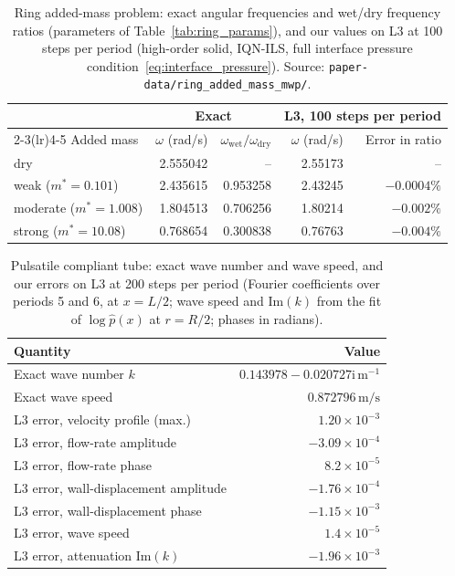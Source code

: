 \begin{table}[htbp]
	\centering
	\small
	\caption{Ring added-mass problem: exact angular frequencies and wet/dry frequency ratios (parameters of Table~\ref{tab:ring_params}), and our values on L3 at 100 steps per period (high-order solid, IQN-ILS, full interface pressure condition~\eqref{eq:interface_pressure}). Source: \texttt{paper-data/ring\_added\_mass\_mwp/}.}
	\label{tab:refvals_ring}
	\begin{tabular}{lrrrr}
		\toprule
		 & \multicolumn{2}{c}{Exact} & \multicolumn{2}{c}{L3, 100 steps per period} \\
		\cmidrule(lr){2-3}\cmidrule(lr){4-5}
		Added mass & $\omega$ (rad/s) & $\omega_\mathrm{wet}/\omega_\mathrm{dry}$ & $\omega$ (rad/s) & Error in ratio \\
		\midrule
		dry & 2.555042 & -- & 2.55173 & -- \\
		weak ($m^* = 0.101$) & 2.435615 & 0.953258 & 2.43245 & $-0.0004\%$ \\
		moderate ($m^* = 1.008$) & 1.804513 & 0.706256 & 1.80214 & $-0.002\%$ \\
		strong ($m^* = 10.08$) & 0.768654 & 0.300838 & 0.76763 & $-0.004\%$ \\
		\bottomrule
	\end{tabular}
\end{table}

\begin{table}[htbp]
	\centering
	\small
	\caption{Pulsatile compliant tube: exact wave number and wave speed, and our errors on L3 at 200 steps per period (Fourier coefficients over periods 5 and 6, at $x = L/2$; wave speed and $\mathrm{Im}(k)$ from the fit of $\log\hat{p}(x)$ at $r = R/2$; phases in radians).}
	\label{tab:refvals_womersley}
	\begin{tabular}{lr}
		\toprule
		Quantity & Value \\
		\midrule
		Exact wave number $k$ & $0.143978 - 0.020727\mathrm{i}\,\mathrm{m^{-1}}$ \\
		Exact wave speed & $0.872796\,\mathrm{m/s}$ \\
		\midrule
		L3 error, velocity profile (max.) & $1.20\times10^{-3}$ \\
		L3 error, flow-rate amplitude & $-3.09\times10^{-4}$ \\
		L3 error, flow-rate phase & $8.2\times10^{-5}$ \\
		L3 error, wall-displacement amplitude & $-1.76\times10^{-4}$ \\
		L3 error, wall-displacement phase & $-1.15\times10^{-3}$ \\
		L3 error, wave speed & $1.4\times10^{-5}$ \\
		L3 error, attenuation $\mathrm{Im}(k)$ & $-1.96\times10^{-3}$ \\
		\bottomrule
	\end{tabular}
\end{table}

